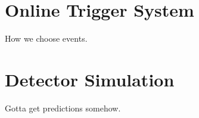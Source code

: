 \section{Online Trigger System}

How we choose events.

\section{Detector Simulation}

Gotta get predictions somehow.



